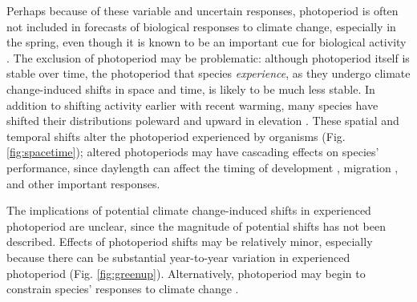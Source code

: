 \documentclass{article}
\begin{document}
\par Perhaps because of these variable and uncertain responses, photoperiod is often not included in forecasts of biological responses to climate change, especially in the spring, even though it is known to be an important cue for biological activity \citep[but see ][]{Caffarra:2011qf,duputie2015,grevstad2015}. The exclusion of photoperiod may be problematic: although photoperiod itself is stable over time, the photoperiod that species \emph{experience}, as they undergo climate change-induced shifts in space and time, is likely to be much less stable. In addition to shifting activity earlier with recent warming, many species have shifted their distributions poleward and upward in elevation \citep[i.e., range shifts,][]{chen2011,harsch2009,parmesan2006,penuelas2003}. These spatial and temporal shifts alter the photoperiod experienced by organisms (Fig. \ref{fig:spacetime}); altered photoperiods may have cascading effects on species' performance, since daylength can affect the timing of development \citep{grevstad2015,muir1994}, migration \citep{dawbin1966}, and other important responses. 

\par The implications of potential climate change-induced shifts in experienced photoperiod are unclear, since the magnitude of potential shifts has not been described. Effects of photoperiod shifts may be relatively minor, especially because there can be substantial year-to-year variation in experienced photoperiod (Fig. \ref{fig:greenup}). Alternatively, photoperiod may begin to constrain species' responses to climate change \citep{koerner2010b}.
\end{document}
